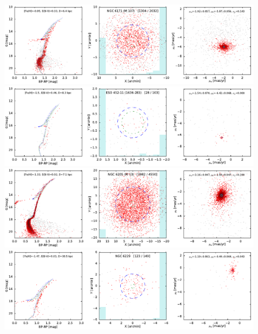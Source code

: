 \documentclass[usenatbib]{mnras}
\begin{document}
\clearpage\begin{figure}
\contcaption{}
\includegraphics{figs/NGC_6171_M107.pdf}
\includegraphics{figs/1636-283_ESO452.pdf}
\includegraphics{figs/NGC_6205_M_13.pdf}
\includegraphics{figs/NGC_6229.pdf}
\end{figure}
\end{document}
